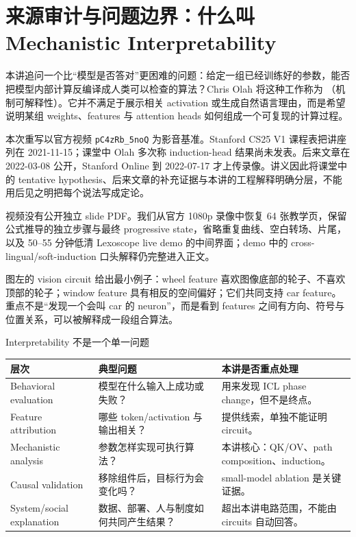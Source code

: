 \section{来源审计与问题边界：什么叫 Mechanistic Interpretability}

本讲追问一个比“模型是否答对”更困难的问题：给定一组已经训练好的参数，能否把模型内部计算反编译成人类可以检查的算法？Chris Olah 将这种工作称为 （机制可解释性）。它并不满足于展示相关 activation 或生成自然语言理由，而是希望说明某组 weights、features 与 attention heads 如何组成一个可复现的计算过程。

本次重写以官方视频 \texttt{pC4zRb\_5noQ} 为影音基准。Stanford CS25 V1 课程表把讲座列在 2021-11-15；课堂中 Olah 多次称 induction-head 结果尚未发表。后来文章在 2022-03-08 公开，Stanford Online 到 2022-07-17 才上传录像。讲义因此将课堂中的 tentative hypothesis、后来文章的补充证据与本讲的工程解释明确分层，不能用后见之明把每个说法写成定论。

视频没有公开独立 slide PDF。我们从官方 1080p 录像中恢复 64 张教学页，保留公式推导的独立步骤与最终 progressive state，省略重复曲线、空白转场、片尾，以及 50--55 分钟低清 Lexoscope live demo 的中间界面；demo 中的 cross-lingual/soft-induction 口头解释仍完整进入正文。


图左的 vision circuit 给出最小例子：wheel feature 喜欢图像底部的轮子、不喜欢顶部的轮子；window feature 具有相反的空间偏好；它们共同支持 car feature。重点不是“发现一个会叫 car 的 neuron”，而是看到 features 之间有方向、符号与位置关系，可以被解释成一段组合算法。


\begin{knowledgebox}{Interpretability 不是一个单一问题}
\begin{tabularx}{\textwidth}{L{0.24\textwidth}X X}
\toprule
层次 & 典型问题 & 本讲是否重点处理 \\
\midrule
Behavioral evaluation & 模型在什么输入上成功或失败？ & 用来发现 ICL phase change，但不是终点。 \\
Feature attribution & 哪些 token/activation 与输出相关？ & 提供线索，单独不能证明 circuit。 \\
Mechanistic analysis & 参数怎样实现可执行算法？ & 本讲核心：QK/OV、path composition、induction。 \\
Causal validation & 移除组件后，目标行为会变化吗？ & small-model ablation 是关键证据。 \\
System/social explanation & 数据、部署、人与制度如何共同产生结果？ & 超出本讲电路范围，不能由 circuits 自动回答。 \\
\bottomrule
\end{tabularx}
\end{knowledgebox}

